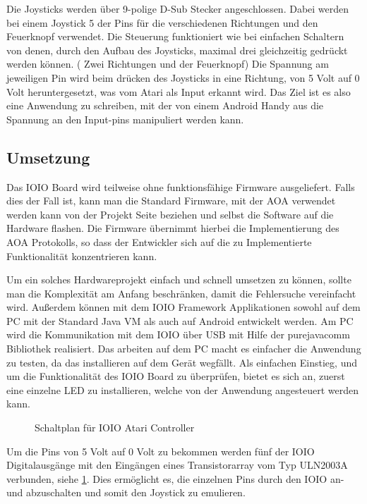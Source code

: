 \documentclass[12pt,journal,compsoc]{IEEEtran}
\begin{document}
Die Joysticks werden über 9-polige D-Sub Stecker angeschlossen.
Dabei werden bei einem Joystick 5 der Pins für die verschiedenen Richtungen und den Feuerknopf verwendet.
Die Steuerung funktioniert wie bei einfachen Schaltern von denen, durch den Aufbau des Joysticks, maximal drei gleichzeitig gedrückt werden können. ( Zwei Richtungen und der Feuerknopf)
Die Spannung am jeweiligen Pin wird beim drücken des Joysticks in eine Richtung, von 5 Volt auf 0 Volt heruntergesetzt, was vom Atari als Input erkannt wird.
Das Ziel ist es also eine Anwendung zu schreiben, mit der von einem Android Handy aus die Spannung an den Input-pins manipuliert werden kann.

\subsection{Umsetzung}
Das IOIO Board wird teilweise ohne funktionsfähige Firmware ausgeliefert. Falls dies der Fall ist, kann man die Standard Firmware, mit der AOA verwendet werden kann von der Projekt Seite beziehen und selbst die Software auf die Hardware flashen.
Die Firmware übernimmt hierbei die Implementierung des AOA Protokolls, so dass der Entwickler sich auf die zu Implementierte Funktionalität konzentrieren kann.

Um ein solches Hardwareprojekt einfach und schnell umsetzen zu können, sollte man die Komplexität am Anfang beschränken, damit die Fehlersuche vereinfacht wird.
Außerdem können mit dem IOIO Framework Applikationen sowohl auf dem PC mit der Standard Java VM als auch auf Android entwickelt werden.
Am PC wird die Kommunikation mit dem IOIO über USB mit Hilfe der purejavacomm Bibliothek realisiert.
Das arbeiten auf dem PC macht es einfacher die Anwendung zu testen, da das installieren auf dem Gerät wegfällt.
Als einfachen Einstieg, und um die Funktionalität des IOIO Board zu überprüfen, bietet es sich an, zuerst eine einzelne LED zu installieren, welche von der Anwendung angesteuert werden kann.
\begin{figure}[h]
\def\svgwidth{\columnwidth}

\caption{Schaltplan für IOIO Atari Controller}
\label{fig:circuit}
\end{figure}

Um die Pins von 5 Volt auf 0 Volt zu bekommen werden fünf der IOIO Digitalausgänge mit den Eingängen eines Transistorarray vom Typ ULN2003A verbunden, siehe \ref{fig:circuit}.
Dies ermöglicht es, die einzelnen Pins durch den IOIO an- und abzuschalten und somit den Joystick zu emulieren.
\end{document}
